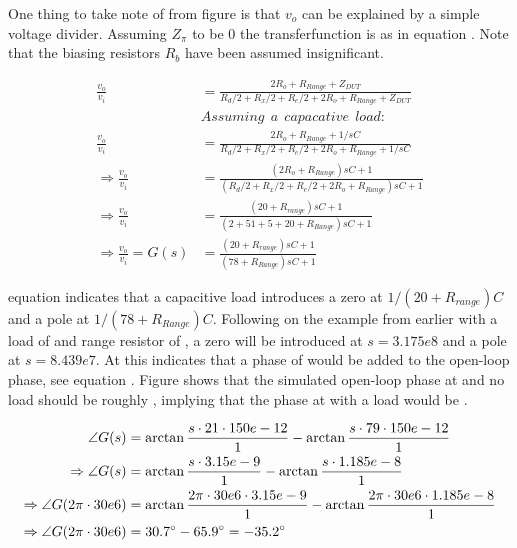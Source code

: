 One thing to take note of from figure  is that $v_o$ can be explained by a simple voltage divider. 
Assuming $Z_\pi$ to be 0 the transferfunction is as in equation . Note that the biasing resistors $R_b$ have been assumed insignificant.

\begin{equation}
\label{eq_DAC_PWR_1}
\begin{split}
    \frac{v_o}{v_i} &= \frac{2R_o + R_{Range}+Z_{DUT}}{R_d/2+R_x/2+R_e/2+2R_o+R_{Range}+Z_{DUT}} \\
    &Assuming \:\: a \:\: capacative \:\: load: \\
    \frac{v_o}{v_i} &= \frac{2R_o + R_{Range}+1/sC}{R_d/2+R_x/2+R_e/2+2R_o+R_{Range}+1/sC} \\
    \Rightarrow \frac{v_o}{v_i} &= \frac{(2R_o + R_{Range})sC+1}{(R_d/2+R_x/2+R_e/2+2R_o+R_{Range})sC+1} \\
    \Rightarrow \frac{v_o}{v_i} &= \frac{(20+R_{range})sC+1}{(2+51+5+20+R_{Range})sC+1} \\
    \Rightarrow \frac{v_o}{v_i} = G(s) &= \frac{(20+R_{range})sC+1}{(78+R_{Range})sC+1}
\end{split}
\end{equation}

equation  indicates that a capacitive load introduces a zero at $1/(20+R_{range})C$ and a pole at $1/(78+R_{Range})C$. Following on the example from earlier with a load of  and range resistor of , a zero will be introduced at $s=3.175e8$ and a pole at $s=8.439e7$. At  this indicates that a phase of  would be added to the open-loop phase, see equation . Figure  shows that the simulated open-loop phase at  and no load should be roughly , implying that the phase at  with a  load would be .

\begin{equation}
\label{eq_DAC_PWR_2}
\begin{split}
    \angle G(s) &= \arctan{\frac{s\cdot21\cdot150e-12}{1}}-\arctan{\frac{s\cdot79\cdot150e-12}{1}} \\
    \Rightarrow \angle G(s) &= \arctan{\frac{s\cdot3.15e-9}{1}}-\arctan{\frac{s\cdot1.185e-8}{1}} \\
    \Rightarrow \angle G(2\pi \cdot30e6) &= \arctan{\frac{2\pi \cdot30e6\cdot3.15e-9}{1}}-\arctan{\frac{2\pi \cdot30e6\cdot1.185e-8}{1}} \\
    \Rightarrow \angle G(2\pi \cdot30e6) &= \SI{30.7}{\degree} - \SI{65.9}{\degree} = \SI{-35.2}{\degree} 
\end{split}
\end{equation}

